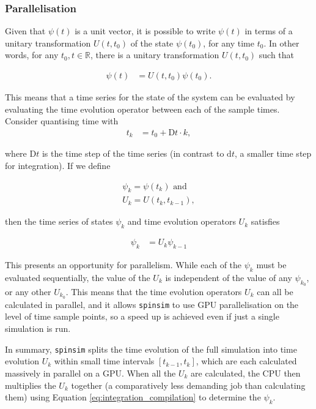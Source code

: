 \documentclass{jors}
\begin{document}
		\subsubsection*{Parallelisation}
			Given that \(\psi(t)\) is a unit vector, it is possible to write \(\psi(t)\) in terms of a unitary transformation \(U(t, t_0)\) of the state \(\psi(t_0)\), for any time \(t_0\). In other words, for any \(t_0,t \in \mathbb{R}\), there is a unitary transformation \(U(t, t_0)\) such that
			
			\begin{align}
				\psi(t) &= U(t, t_0)\psi(t_0).
			\end{align}
			
			This means that a time series for the state of the system can be evaluated by evaluating the time evolution operator between each of the sample times. Consider quantising time with
			\begin{align}
				t_k &= t_0 + \mathrm{D}t\cdot k,
			\end{align}

			where \(\mathrm{D}t\) is the time step of the time series (in contrast to \(\mathrm{d}t\), a smaller time step for integration). If we define

			\begin{align}
				\psi_k = \psi(t_k)\textrm{ and}\\
				U_k = U(t_{k}, t_{k-1}),
			\end{align}
			
			then the time series of states \(\psi_k\) and time evolution operators \(U_k\) satisfies

			\begin{align}
				\psi_k &= U_k\psi_{k-1}\label{eq:integration_compilation}
			\end{align}

			This presents an opportunity for parallelism. While each of the \(\psi_k\) must be evaluated sequentially, the value of the \(U_k\) is independent of the value of any \(\psi_{k_0}\), or any other \(U_{k_0}\). This means that the time evolution operators \(U_k\) can all be calculated in parallel, and it allows \texttt{spinsim} to use GPU parallelisation on the level of time sample points, so a speed up is achieved even if just a single simulation is run.

			In summary, \texttt{spinsim} splits the time evolution of the full simulation into time evolution \(U_k\) within small time intervals \([t_{k - 1}, t_{k}]\), which are each calculated massively in parallel on a GPU. When all the \(U_k\) are calculated, the CPU then multiplies the \(U_k\) together (a comparatively less demanding job than calculating them) using Equation \eqref{eq:integration_compilation} to determine the \(\psi_k\).
\end{document}
